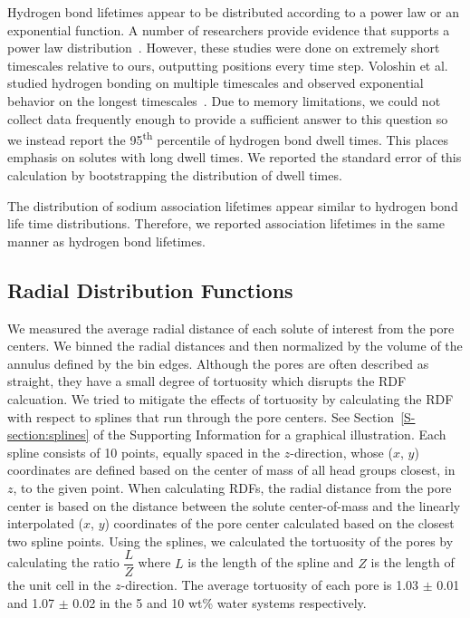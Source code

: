 \documentclass[journal=jpcbfk,manuscript=article]{achemso}
\begin{document}
  Hydrogen bond lifetimes appear to be distributed according to a power law or an
  exponential function. A number of researchers provide evidence that supports a 
  power law distribution~\cite{starr_fast_1999,martiniano_insights_2013}. However, these
  studies were done on extremely short timescales relative to ours, outputting positions
  every time step. Voloshin et al. studied hydrogen bonding on multiple timescales and 
  observed exponential behavior on the longest timescales~\cite{voloshin_hydrogen_2009}. 
  Due to memory limitations, we could not collect data frequently enough to provide a
  sufficient answer to this question so we instead report the 95\textsuperscript{th} 
  percentile of hydrogen bond dwell times. This places emphasis on solutes with 
  long dwell times. We reported the standard error of this calculation by bootstrapping
  the distribution of dwell times.
  
  The distribution of sodium association lifetimes appear similar to
  hydrogen bond life time distributions. Therefore, we reported association
  lifetimes in the same manner as hydrogen bond lifetimes.
  
  \subsection{Radial Distribution Functions}\label{method:rdfs}

  We measured the average radial distance of each solute of interest 
  from the pore centers. We binned the radial distances and then 
  normalized by the volume of the annulus defined by the bin edges.
  Although the pores are often described as straight, they have a
  small degree of tortuosity which disrupts the RDF calcuation. We 
  tried to mitigate the effects of tortuosity by calculating the RDF
  with respect to splines that run through the pore centers. See
  Section~\ref{S-section:splines} of the Supporting Information for 
  a graphical illustration. Each spline consists of 10 points, equally
  spaced in the $z$-direction, whose ($x$, $y$) coordinates are defined
  based on the center of mass of all head groups closest, in $z$, to the
  given point. When calculating RDFs, the radial distance from the pore 
  center is based on the distance between the solute center-of-mass and
  the linearly interpolated ($x$, $y$) coordinates of the pore center 
  calculated based on the closest two spline points. Using the splines, 
  we calculated the tortuosity of the pores by calculating the ratio 
  $\dfrac{L}{Z}$ where $L$ is the length of the spline and $Z$ is the 
  length of the unit cell in the $z$-direction. The average tortuosity
  of each pore is 1.03 $\pm$ 0.01 and 1.07 $\pm$ 0.02 in the 5 and 10 wt\%
  water systems respectively.
  
\end{document}
